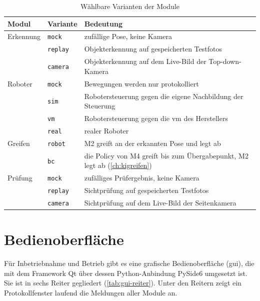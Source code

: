 \begin{table}[htbp]
  \centering
  \caption{Wählbare Varianten der Module}
  \label{tab:varianten}
  \begin{tabularx}{\textwidth}{@{}l l X@{}}
    \toprule
    Modul & Variante & Bedeutung \\
    \midrule
    Erkennung & \texttt{mock}   & zufällige Pose, keine Kamera \\
              & \texttt{replay} & Objekterkennung auf gespeicherten Testfotos \\
              & \texttt{camera} & Objekterkennung auf dem Live-Bild der Top-down-Kamera \\
    \midrule
    Roboter   & \texttt{mock}   & Bewegungen werden nur protokolliert \\
              & \texttt{sim}    & Robotersteuerung gegen die eigene Nachbildung der Steuerung \\
              & \texttt{vm}     & Robotersteuerung gegen die \ac{vm} des Herstellers \\
              & \texttt{real}   & realer Roboter \\
    \midrule
    Greifen   & \texttt{robot}  & M2 greift an der erkannten Pose und legt ab \\
              & \texttt{bc}     & die Policy von M4 greift bis zum Übergabepunkt, M2 legt ab
                                  (\cref{ch:kigreifen}) \\
    \midrule
    Prüfung   & \texttt{mock}   & zufälliges Prüfergebnis, keine Kamera \\
              & \texttt{replay} & Sichtprüfung auf gespeicherten Testfotos \\
              & \texttt{camera} & Sichtprüfung auf dem Live-Bild der Seitenkamera \\
    \bottomrule
  \end{tabularx}
\end{table}

\section{Bedienoberfläche}
\label{sec:int-gui}

Für Inbetriebnahme und Betrieb gibt es eine grafische Bedienoberfläche (\ac{gui}), die mit
dem Framework Qt über dessen Python-Anbindung PySide6 umgesetzt ist. Sie ist in sechs Reiter
gegliedert (\cref{tab:gui-reiter}). Unter den Reitern zeigt ein Protokollfenster laufend die
Meldungen aller Module an.

